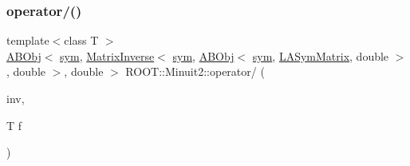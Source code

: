 \subsubsection{\texorpdfstring{operator/()}{operator/()}\hspace{0.1cm}{\footnotesize\ttfamily [1/3]}}
{\footnotesize\ttfamily template$<$class T $>$ \\
\mbox{\hyperlink{classROOT_1_1Minuit2_1_1ABObj}{A\+B\+Obj}}$<$ \mbox{\hyperlink{classROOT_1_1Minuit2_1_1sym}{sym}}, \mbox{\hyperlink{classROOT_1_1Minuit2_1_1MatrixInverse}{Matrix\+Inverse}}$<$ \mbox{\hyperlink{classROOT_1_1Minuit2_1_1sym}{sym}}, \mbox{\hyperlink{classROOT_1_1Minuit2_1_1ABObj}{A\+B\+Obj}}$<$ \mbox{\hyperlink{classROOT_1_1Minuit2_1_1sym}{sym}}, \mbox{\hyperlink{classROOT_1_1Minuit2_1_1LASymMatrix}{L\+A\+Sym\+Matrix}}, double $>$, double $>$, double $>$ R\+O\+O\+T\+::\+Minuit2\+::operator/ (\begin{DoxyParamCaption}\item[{const \mbox{\hyperlink{classROOT_1_1Minuit2_1_1ABObj}{A\+B\+Obj}}$<$ \mbox{\hyperlink{classROOT_1_1Minuit2_1_1sym}{sym}}, \mbox{\hyperlink{classROOT_1_1Minuit2_1_1MatrixInverse}{Matrix\+Inverse}}$<$ \mbox{\hyperlink{classROOT_1_1Minuit2_1_1sym}{sym}}, \mbox{\hyperlink{classROOT_1_1Minuit2_1_1ABObj}{A\+B\+Obj}}$<$ \mbox{\hyperlink{classROOT_1_1Minuit2_1_1sym}{sym}}, \mbox{\hyperlink{classROOT_1_1Minuit2_1_1LASymMatrix}{L\+A\+Sym\+Matrix}}, double $>$, double $>$, double $>$ \&}]{inv,  }\item[{T}]{f }\end{DoxyParamCaption})\hspace{0.3cm}{\ttfamily [inline]}}

\mbox{\label{namespaceROOT_1_1Minuit2_aa961ad5b61bfb20977d423945ad1a8f9}} 
